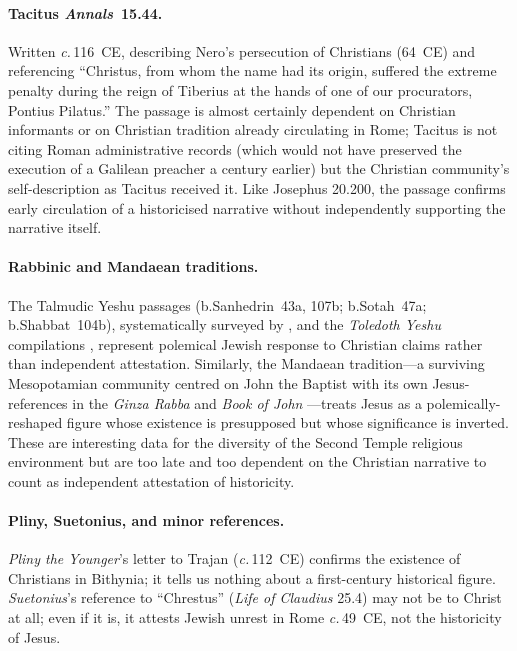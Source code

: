 \documentclass[12pt,oneside]{article}
\newcommand{\circa}{\textit{c.}\,}
\begin{document}
\paragraph{Tacitus \textit{Annals}~15.44.}
Written \circa 116~CE, describing Nero's persecution of Christians
(64~CE) and referencing \enquote{Christus, from whom the name had
its origin, suffered the extreme penalty during the reign of
Tiberius at the hands of one of our procurators, Pontius
Pilatus.}  The passage is almost certainly dependent on Christian
informants or on Christian tradition already circulating in Rome;
Tacitus is not citing Roman administrative records (which would
not have preserved the execution of a Galilean preacher a century
earlier) but the Christian community's self-description as
Tacitus received it.  Like Josephus 20.200, the passage confirms
early circulation of a historicised narrative without independently
supporting the narrative itself.

\paragraph{Rabbinic and Mandaean traditions.}
The Talmudic Yeshu passages (b.Sanhedrin~43a, 107b; b.Sotah~47a;
b.Shabbat~104b), systematically surveyed by \citet{SchaferP2007},
and the \textit{Toledoth Yeshu} compilations
\citep{MeersonSchafer2014}, represent polemical Jewish response to
Christian claims rather than independent attestation.  Similarly,
the Mandaean tradition---a surviving Mesopotamian community
centred on John the Baptist with its own Jesus-references in the
\textit{Ginza Rabba} and \textit{Book of John}
\citep{Rudolph1978,BuckleyMandaeans2002,Lupieri2002}---treats Jesus
as a polemically-reshaped figure whose existence is presupposed
but whose significance is inverted.  These are interesting data
for the diversity of the Second Temple religious environment but
are too late and too dependent on the Christian narrative to count
as independent attestation of historicity.

\paragraph{Pliny, Suetonius, and minor references.}
\textit{Pliny the Younger}'s letter to Trajan (\circa 112~CE)
confirms the existence of Christians in Bithynia; it tells us
nothing about a first-century historical figure.  \textit{Suetonius}'s
reference to \enquote{Chrestus} (\textit{Life of Claudius} 25.4)
may not be to Christ at all; even if it is, it attests Jewish
unrest in Rome \circa 49~CE, not the historicity of Jesus.
\end{document}
